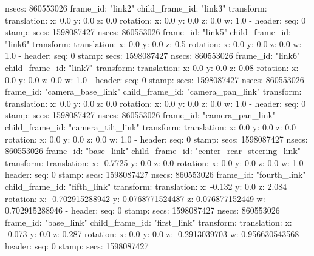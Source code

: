         nsecs: 860553026
      frame_id: "link2"
    child_frame_id: "link3"
    transform: 
      translation: 
        x: 0.0
        y: 0.0
        z: 0.0
      rotation: 
        x: 0.0
        y: 0.0
        z: 0.0
        w: 1.0
  - 
    header: 
      seq: 0
      stamp: 
        secs: 1598087427
        nsecs: 860553026
      frame_id: "link5"
    child_frame_id: "link6"
    transform: 
      translation: 
        x: 0.0
        y: 0.0
        z: 0.5
      rotation: 
        x: 0.0
        y: 0.0
        z: 0.0
        w: 1.0
  - 
    header: 
      seq: 0
      stamp: 
        secs: 1598087427
        nsecs: 860553026
      frame_id: "link6"
    child_frame_id: "link7"
    transform: 
      translation: 
        x: 0.0
        y: 0.0
        z: 0.08
      rotation: 
        x: 0.0
        y: 0.0
        z: 0.0
        w: 1.0
  - 
    header: 
      seq: 0
      stamp: 
        secs: 1598087427
        nsecs: 860553026
      frame_id: "camera_base_link"
    child_frame_id: "camera_pan_link"
    transform: 
      translation: 
        x: 0.0
        y: 0.0
        z: 0.0
      rotation: 
        x: 0.0
        y: 0.0
        z: 0.0
        w: 1.0
  - 
    header: 
      seq: 0
      stamp: 
        secs: 1598087427
        nsecs: 860553026
      frame_id: "camera_pan_link"
    child_frame_id: "camera_tilt_link"
    transform: 
      translation: 
        x: 0.0
        y: 0.0
        z: 0.0
      rotation: 
        x: 0.0
        y: 0.0
        z: 0.0
        w: 1.0
  - 
    header: 
      seq: 0
      stamp: 
        secs: 1598087427
        nsecs: 860553026
      frame_id: "base_link"
    child_frame_id: "center_rear_steering_link"
    transform: 
      translation: 
        x: -0.7725
        y: 0.0
        z: 0.0
      rotation: 
        x: 0.0
        y: 0.0
        z: 0.0
        w: 1.0
  - 
    header: 
      seq: 0
      stamp: 
        secs: 1598087427
        nsecs: 860553026
      frame_id: "fourth_link"
    child_frame_id: "fifth_link"
    transform: 
      translation: 
        x: -0.132
        y: 0.0
        z: 2.084
      rotation: 
        x: -0.702915288942
        y: 0.0768771524487
        z: 0.076877152449
        w: 0.702915288946
  - 
    header: 
      seq: 0
      stamp: 
        secs: 1598087427
        nsecs: 860553026
      frame_id: "base_link"
    child_frame_id: "first_link"
    transform: 
      translation: 
        x: -0.073
        y: 0.0
        z: 0.287
      rotation: 
        x: 0.0
        y: 0.0
        z: -0.2913039703
        w: 0.956630543568
  - 
    header: 
      seq: 0
      stamp: 
        secs: 1598087427
